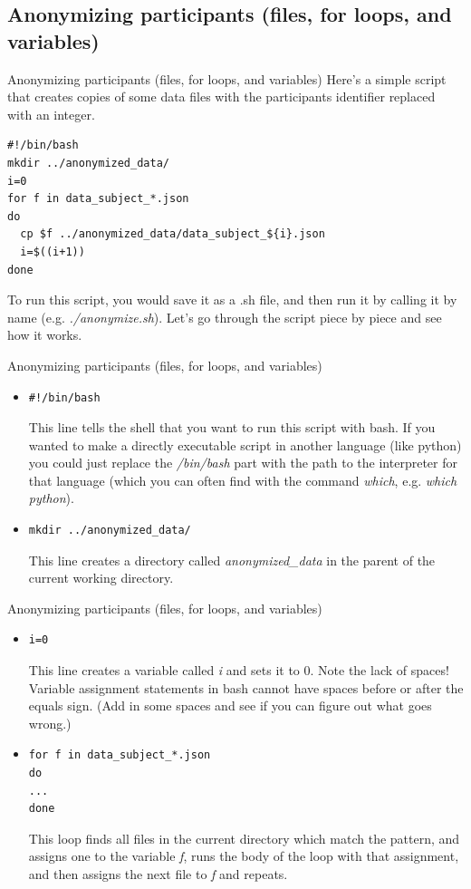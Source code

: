 \documentclass{beamer}
\begin{document}
\subsection{Anonymizing participants (files, for loops, and variables)}
\begin{frame}[fragile]{Anonymizing participants (files, for loops, and variables)}
Here's a simple script that creates copies of some data files with the participants identifier replaced with an integer. 
\begin{lstlisting}[title=anonymize.sh]
#!/bin/bash
mkdir ../anonymized_data/
i=0
for f in data_subject_*.json
do
  cp $f ../anonymized_data/data_subject_${i}.json
  i=$((i+1))
done
\end{lstlisting}
To run this script, you would save it as a .sh file, and then run it by calling it by name (e.g. \emph{./anonymize.sh}). Let's go through the script piece by piece and see how it works. 
\end{frame}

\begin{frame}[fragile]{Anonymizing participants (files, for loops, and variables)}
\begin{itemize}
\item<1->
\begin{lstlisting}
#!/bin/bash
\end{lstlisting} 
This line tells the shell that you want to run this script with bash. If you wanted to make a directly executable script in another language (like python) you could just replace the \emph{/bin/bash} part with the path to the interpreter for that language (which you can often find with the command \emph{which}, e.g. \emph{which python}).
\item<2->
\begin{lstlisting}
mkdir ../anonymized_data/
\end{lstlisting}
This line creates a directory called \emph{anonymized\_data} in the parent of the current working directory.
\end{itemize}
\end{frame}

\begin{frame}[fragile]{Anonymizing participants (files, for loops, and variables)}
\begin{itemize}
\item<1->
\begin{lstlisting}
i=0
\end{lstlisting} 
This line creates a variable called \emph{i} and sets it to 0. Note the lack of spaces! Variable assignment statements in bash cannot have spaces before or after the equals sign. (Add in some spaces and see if you can figure out what goes wrong.)
\item<2->
\begin{lstlisting}
for f in data_subject_*.json
do
...
done
\end{lstlisting} 
This loop finds all files in the current directory which match the pattern, and assigns one to the variable \emph{f}, runs the body of the loop with that assignment, and then assigns the next file to \emph{f} and repeats. 
\end{itemize}
\end{frame}
\end{document}
